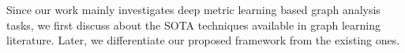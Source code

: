 
Since our work mainly investigates deep metric learning based graph analysis tasks, we first discuss about the SOTA techniques available in graph learning literature. Later, we differentiate our proposed framework from the existing ones.

